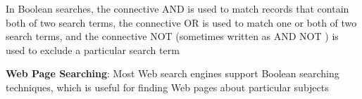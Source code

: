 \begin{center}
\noindent{}
\end{center}
\begin{tcolorbox}[colback=white, colframe=gray!60, title=Remark 1]
In Boolean searches, the connective AND is used to match records that contain both of
two search terms, the connective OR is used to match one or both of two search terms, and the
connective NOT (sometimes written as AND NOT ) is used to exclude a particular search term
\end{tcolorbox}
\begin{tcolorbox}[colback=white, colframe=gray!60, title=Remark 2]
\textbf{Web Page Searching}: 
 Most Web search engines support Boolean searching techniques, which
is useful for finding Web pages about particular subjects
\end{tcolorbox}
